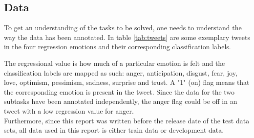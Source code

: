 \subsection{Data} \label{sec:introdata}
To get an understanding of the tasks to be solved, one needs to understand the way the data has been annotated. In table \ref{tab:tweets} are some exemplary tweets in the four regression emotions and their corresponding classification labels.\\
\begin{table}[H]
\caption{Exemplary tweets with regression and classification labels}
\label{tab:tweets}
\end{table}
The regressional value is how much of a particular emotion is felt and the classification labels are mapped as such: anger, anticipation, disgust, fear, joy, love, optimism, pessimism, sadness, surprise and trust. A "1" (on) flag means that the corresponding emotion is present in the tweet. Since the data for the two subtasks have been annotated independently, the anger flag could be off in an tweet with a low regression value for anger. \\
Furthermore, since this report was written before the release date of the test data sets, all data used in this report is either train data or development data.